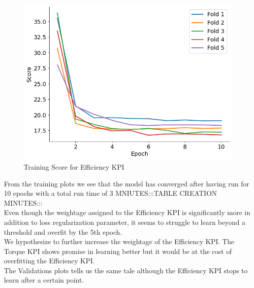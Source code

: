 \documentclass{report} %
\begin{document}
\begin{figure}[H]
    \hfill
    \begin{minipage}[b]{0.325\textwidth}
        \includegraphics[width=\textwidth]{./ReportImages/train_score_y2.png}
        \caption{\centering Training Score for Efficiency \ac{KPI}}
        \label{fig:Training Score for Efficiency grid}
    \end{minipage}
\end{figure}

From the training plots we see that the model has converged after having run for 10 epochs with a total run time of 3 MNIUTES:::TABLE CREATION MINUTES:::\\
Even though the weightage assigned to the Efficiency \ac{KPI} is significantly more in addition to loss regularization parameter, it seems to struggle to learn beyond a threshold and overfit by the 5th epoch.\\
We hypothesize to further increase the weightage of the Efficiency \ac{KPI}.
The Torque \ac{KPI} shows promise in learning better but it would be at the cost of overfitting the Efficiency \ac{KPI}.\\
The Validations plots tells us the same tale although the Efficiency \ac{KPI} stops to learn after a certain point.
\end{document}
